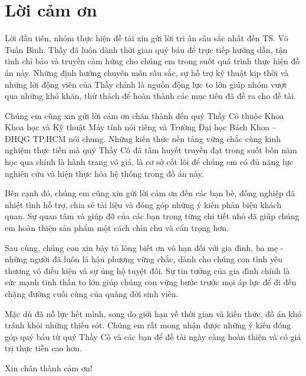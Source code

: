 \chapter*{Lời cảm ơn}

Lời đầu tiên, nhóm thực hiện đề tài xin gửi lời tri ân sâu sắc nhất đến TS. Võ Tuấn Bình. Thầy đã luôn dành thời gian quý báu để trực tiếp hướng dẫn, tận tình chỉ bảo và truyền cảm hứng cho chúng em trong suốt quá trình thực hiện đồ án này. Những định hướng chuyên môn sâu sắc, sự hỗ trợ kỹ thuật kịp thời và những lời động viên của Thầy chính là nguồn động lực to lớn giúp nhóm vượt qua những khó khăn, thử thách để hoàn thành các mục tiêu đã đề ra cho đề tài.

Chúng em cũng xin gửi lời cảm ơn chân thành đến quý Thầy Cô thuộc Khoa Khoa học và Kỹ thuật Máy tính nói riêng và Trường Đại học Bách Khoa – ĐHQG TP.HCM nói chung. Những kiến thức nền tảng vững chắc cùng kinh nghiệm thực tiễn mà quý Thầy Cô đã tâm huyết truyền đạt trong suốt bốn năm học qua chính là hành trang vô giá, là cơ sở cốt lõi để chúng em có đủ năng lực nghiên cứu và hiện thực hóa hệ thống trong đồ án này.

Bên cạnh đó, chúng em cũng xin gửi lời cảm ơn đến các bạn bè, đồng nghiệp đã nhiệt tình hỗ trợ, chia sẻ tài liệu và đóng góp những ý kiến phản biện khách quan. Sự quan tâm và giúp đỡ của các bạn trong từng chi tiết nhỏ đã giúp chúng em hoàn thiện sản phẩm một cách chỉn chu và cẩn trọng hơn.

Sau cùng, chúng con xin bày tỏ lòng biết ơn vô hạn đối với gia đình, ba mẹ - những người đã luôn là hậu phương vững chắc, dành cho chúng con tình yêu thương vô điều kiện và sự ủng hộ tuyệt đối. Sự tin tưởng của gia đình chính là sức mạnh tinh thần to lớn giúp chúng con vững bước trước mọi áp lực để đi đến chặng đường cuối cùng của quãng đời sinh viên.

Mặc dù đã nỗ lực hết mình, song do giới hạn về thời gian và kiến thức, đồ án khó tránh khỏi những thiếu sót. Chúng em rất mong nhận được những ý kiến đóng góp quý báu từ quý Thầy Cô và các bạn để đề tài ngày càng hoàn thiện và có giá trị thực tiễn cao hơn.

Xin chân thành cảm ơn!